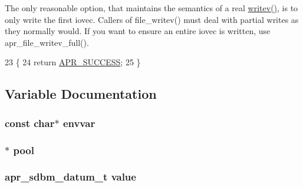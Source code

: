 The only reasonable option, that maintains the semantics of a real \hyperlink{apr__arch__os2calls_8h_a3d0f3996136a9b5ab46431c60c746efd}{writev()}, is to only write the first iovec. Callers of file\+\_\+writev() must deal with partial writes as they normally would. If you want to ensure an entire iovec is written, use apr\+\_\+file\+\_\+writev\+\_\+full().
\begin{DoxyCode}
23 \{
24     \textcolor{keywordflow}{return} \hyperlink{group__apr__errno_ga9ee311b7bf1c691dc521d721339ee2a6}{APR\_SUCCESS};
25 \}
\end{DoxyCode}


\subsection{Variable Documentation}
\subsubsection[{\texorpdfstring{envvar}{envvar}}]{\setlength{\rightskip}{0pt plus 5cm}const char$\ast$ envvar}\hypertarget{group__apr__env_ga933fca1db5dfcd5330db8ef170f35d4b}{}\label{group__apr__env_ga933fca1db5dfcd5330db8ef170f35d4b}
\subsubsection[{\texorpdfstring{pool}{pool}}]{$\ast$ pool}\hypertarget{group__apr__env_ga35230907c170df5d4d7f0ca99274c574}{}\label{group__apr__env_ga35230907c170df5d4d7f0ca99274c574}
\subsubsection[{\texorpdfstring{value}{value}}]{ {\bf apr\+\_\+sdbm\+\_\+datum\+\_\+t} value}\hypertarget{group__apr__env_ga711ebc0efad43aba10f32ded4a28cf17}{}\label{group__apr__env_ga711ebc0efad43aba10f32ded4a28cf17}
